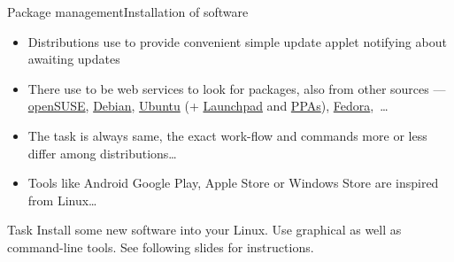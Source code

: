 \documentclass[compress, ucs, xelatex, 11pt, xcolor=svgnames, aspectratio=169,
	hyperref={
		bookmarks=true,
		unicode=true,
		colorlinks=true,
		pdftitle={Linux, command line and MetaCentrum},
		plainpages=false,
		pdfauthor={Vojtech Zeisek},
		pdfsubject={Course about use of Linux command line, writing shell scripts and using MetaCentrum of CESNET},
		pdfcreator={XeLaTeX},
		pdfkeywords={Linux, GNU, BASH, shell, command line, MetaCentrum},
		linkcolor=DarkRed, %
		anchorcolor=DarkBlue, %
		citecolor=Indigo, %
		filecolor=NavyBlue, %
		menucolor=DarkMagenta, %
		urlcolor=DarkBlue, %
		pdftex},
	url={hyphens, lowtilde} %
	]{beamer}
\begin{document}
\begin{frame}[allowframebreaks]{Package management}{Installation of software}
\begin{itemize}
		\begin{itemize}
			\item Ubuntu Software Center
			\item Synaptic --- feature rich, graphical, advances, for any DEB distribution
			\item Aptitude --- feature rich, command-line, advanced, for any DEB distribution (more advanced version of Apt)
			\item DPKG --- low-level, any DEB-based distribution
			\item YaST Software for openSUSE (feature rich, graphical as well as command-line)
			\item Zypper --- feature rich, command-line, advanced, for openSUSE
			\item DNF --- feature rich, command-line, advanced, for Fedora and another RPM based distributions (replacing older Yum)
			\item RPM --- low level, any RPM-based distribution
			\item GNOME software --- in most of distributions using GNOME
			\item And many more\ldots
		\end{itemize}
		\item Distributions use to provide convenient simple update applet notifying about awaiting updates
		\item There use to be web services to look for packages, also from other sources --- \href{https://software.opensuse.org/search}{openSUSE}, \href{https://www.debian.org/distrib/packages\#search_packages}{Debian}, \href{https://packages.ubuntu.com/}{Ubuntu} (+ \href{https://launchpad.net/ubuntu/+search}{Launchpad} and \href{https://launchpad.net/ubuntu/+ppas}{PPAs}), \href{https://apps.fedoraproject.org/packages/}{Fedora},~\ldots
		\item The task is always same, the exact work-flow and commands more or less differ among distributions\ldots
		\item Tools like Android Google Play, Apple Store or Windows Store are inspired from Linux\ldots
	\end{itemize}
	\vfill
	\begin{block}{Task}
		Install some new software into your Linux. Use graphical as well as command-line tools. See following slides for instructions.
	\end{block}
\end{frame}
\end{document}

